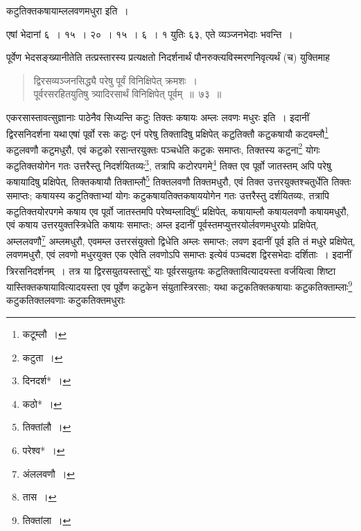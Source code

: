 \documentclass[10pt, openany]{book}
\begin{document}
{{{\hspace{2mm} {\qt कटुतिक्तकषायाम्ललवणमधुरा} इति~।
\vspace{2mm}

{एषां भेदानां ६~। १५~। २०~। १५~। ६~। १ युतिः ६३, एते व्यञ्जनभेदाः
भवन्ति~।}
\vspace{2mm}

{पूर्वेण भेदसङ्ख्यानीतेति तत्प्रस्तारस्य प्रत्यक्षतो निदर्शनार्थं
पौनरुक्त्यविस्मरणनिवृत्यर्थं (च) युक्तिमाह\textendash}

\begin{quote}

{\bs  द्विरसव्यञ्जनसिद्ध्यै परेषु पूर्वं विनिक्षिपेत् क्रमशः~।\\
पूर्वरसरहितयुतिषु त्र्यादिरसार्थं विनिक्षिपेत् पूर्वम्~॥~७३~॥}\end{quote}

{एकरसास्तावत्सुज्ञानाः पाठेनैव सिध्यन्ति कटुः तिक्तः कषायः अम्लः लवणः
मधुरः}
{इति~। इदानीं द्विरसनिदर्शना यथा\textendash \,एषां पूर्वो रसः कटुः एनं परेषु
तिक्तादिषु प्रक्षिपेत्}
{कटुतिक्तौ कटुकषायौ कट्वम्लौ\renewcommand{\thefootnote}{\s ४}\footnote{\s कटूम्लौ~।} कटुलवणौ कटुमधुरौ, एवं कटुको
रसान्तरयुक्तः पञ्चधेति कटुकः समाप्तः, तिक्तस्य कटुना\renewcommand{\thefootnote}{\s ५}\footnote{\s कटुता~।} योगः कटुतिक्तयोगेन गतः
उत्तरैस्तु}
{निदर्शयितव्यः\renewcommand{\thefootnote}{\s ६}\footnote{\s दिनदर्श*~।}, तत्रापि कटोरपगमे\renewcommand{\thefootnote}{\s ७}\footnote{\s कठो*~।} तिक्त एव पूर्वो जातस्तम् अपि
परेषु कषायादिषु}
{प्रक्षिपेत्, तिक्तकषायौ तिक्ताम्लौ\renewcommand{\thefootnote}{\s ८}\footnote{\s तिक्तांलौ~।}  तिक्तलवणौ तिक्तमधुरौ, एवं तिक्त
उत्तरयुक्तश्चतुर्धेति तिक्तः समाप्तः; कषायस्य कटुतिक्ताभ्यां योगः
कटुकषायतिक्तकषाययोगेन}
{गतः उत्तरैस्तु दर्शयितव्यः, तत्रापि कटुतिक्तयोरपगमे कषाय एव पूर्वो
जातस्तमपि}
{परेष्वम्लादिषु\renewcommand{\thefootnote}{\s ९}\footnote{\s परेश्व*~।} प्रक्षिपेत्, कषायाम्लौ कषायलवणौ कषायमधुरौ, एवं कषाय
उत्तरयुक्तस्त्रिधेति}
{कषायः समाप्तः; अम्ल इदानीं पूर्वस्तमप्युत्तरयोर्लवणमधुरयोः प्रक्षिपेत्,
अम्ललवणौ\renewcommand{\thefootnote}{\s १०}\footnote{\s अंललवणौ~।} अम्लमधुरौ, एवमम्ल उत्तरसंयुक्तो द्विधेति अम्लः समाप्तः; लवण इदानीं
पूर्व इति तं मधुरे}
{प्रक्षिपेत्, लवणमधुरौ, एवं लवणो मधुरयुक्त एक एवेति लवणोऽपि समाप्तः
इत्येवं पञ्चदश}
{द्विरसभेदाः दर्शिताः~। इदानीं त्रिरसनिदर्शनम्~। तत्र या
द्विरसयुतयस्तासु\renewcommand{\thefootnote}{\s ११}\footnote{\s *तास~।} याः पूर्वरसयुतयः}
{कटुतिक्तावित्यादयस्ता वर्जयित्वा शिष्टा यास्तिक्तकषायावित्यादयस्ता एव
पूर्वेण कटुकेन}
{संयुतास्त्रिरसाः; यथा कटुकतिक्तकषायाः कटुकतिक्ताम्लाः\renewcommand{\thefootnote}{\s १२}\footnote{\s *तिक्तांला~।}
कटुकतिक्तलवणाः कटुकतिक्तमधुराः}

}}}
\end{document}
